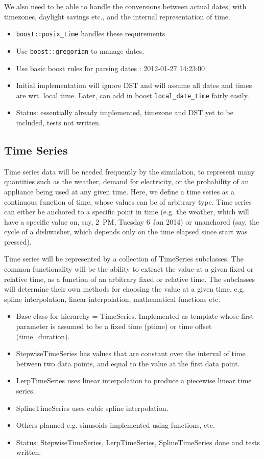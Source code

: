 \documentclass[12pt]{article}
\newcommand{\itm}[1]{\begin{itemize}#1\end{itemize}}
\begin{document}
We also need to be able to handle the conversions between actual dates, with timezones, daylight savings etc., and the internal representation of time.

\itm{
	\item \texttt{boost::posix\_time} handles these requirements.
	\item Use \texttt{boost::gregorian} to manage dates.
	\item Use basic boost rules for parsing dates : 2012-01-27 14:23:00
	\item Initial implementation will ignore DST and will assume all dates and times are wrt. local time. Later, can add in boost \texttt{local\_date\_time} fairly easily.
	\item Status: essentially already implemented, timezone and DST yet to be included, tests not written.
}


\subsection{Time Series}
Time series data will be needed frequently by the simulation, to represent many quantities such as the weather, demand for electricity, or the probability of an appliance being used at any given time. Here, we define a time series as a continuous function of time, whose values can be of arbitrary type. Time series can either be anchored to a specific point in time (e.g.  the weather, which will have a specific value on, say, 2~PM, Tuesday 6 Jan 2014) or unanchored (say, the cycle of a dishwasher, which depends only on the time elapsed since start was pressed).

Time series will be represented by a collection of TimeSeries subclasses. The common functionality will be the ability to extract the value at a given fixed or relative time, as a function of an arbitrary fixed or relative time. The subclasses will determine their own methods for choosing the value at a given time, e.g. spline interpolation, linear interpolation, mathematical functions etc.

\itm{
	\item Base class for hierarchy = TimeSeries. Implemented as template whose first parameter is assumed to be a fixed time (ptime) or time offset (time\_duration).
	\item StepwiseTimeSeries has values that are constant over the interval of time between two data points, and equal to the value at the first data point.
	\item LerpTimeSeries uses linear interpolation to produce a piecewise linear time series.
	\item SplineTimeSeries uses cubic spline interpolation.
	\item Others planned e.g. sinusoids implemented using functions, etc.
	\item Status: StepwiseTimeSeries, LerpTimeSeries, SplineTimeSeries done and tests written.
}
\end{document}
